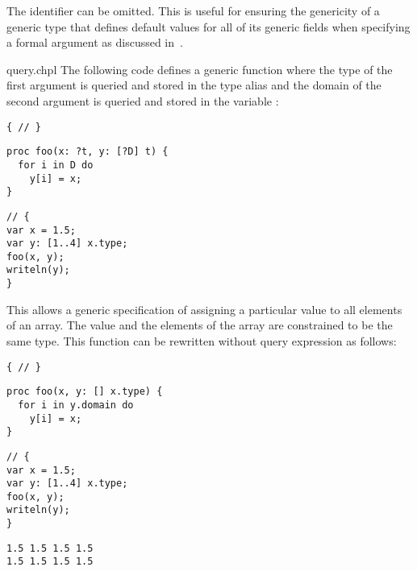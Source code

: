 The identifier can be omitted.  This is useful for ensuring the
genericity of a generic type that defines default values for all of
its generic fields when specifying a formal argument as discussed
in~.

\begin{chapelexample}{query.chpl}
The following code defines a generic function where the type of the
first argument is queried and stored in the type alias  and
the domain of the second argument is queried and stored in the
variable :
\begin{chapelnoprint}
\begin{verbatim}
{ // }
\end{verbatim}
\end{chapelnoprint}
\begin{chapel}
\begin{verbatim}
proc foo(x: ?t, y: [?D] t) {
  for i in D do
    y[i] = x;
}
\end{verbatim}
\end{chapel}
\begin{chapelnoprint}
\begin{verbatim}
// {
var x = 1.5;
var y: [1..4] x.type;
foo(x, y);
writeln(y);
}
\end{verbatim}
\end{chapelnoprint}
This allows a generic specification of assigning a
particular value to all elements of an array.  The value and the
elements of the array are constrained to be the same type.  This
function can be rewritten without query expression as follows:
\begin{chapelnoprint}
\begin{verbatim}
{ // }
\end{verbatim}
\end{chapelnoprint}
\begin{chapel}
\begin{verbatim}
proc foo(x, y: [] x.type) {
  for i in y.domain do
    y[i] = x;
}
\end{verbatim}
\end{chapel}
\begin{chapelnoprint}
\begin{verbatim}
// {
var x = 1.5;
var y: [1..4] x.type;
foo(x, y);
writeln(y);
}
\end{verbatim}
\end{chapelnoprint}
\begin{chapeloutput}
\begin{verbatim}
1.5 1.5 1.5 1.5
1.5 1.5 1.5 1.5
\end{verbatim}
\end{chapeloutput}
\end{chapelexample}

